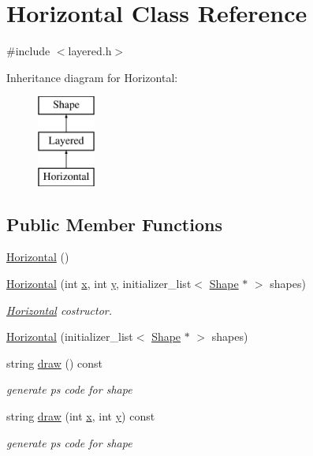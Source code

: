\hypertarget{class_horizontal}{}\section{Horizontal Class Reference}
\label{class_horizontal}


{\ttfamily \#include $<$layered.\+h$>$}

Inheritance diagram for Horizontal\+:\begin{figure}[H]
\begin{center}
\leavevmode
\includegraphics[height=3.000000cm]{class_horizontal}
\end{center}
\end{figure}
\subsection*{Public Member Functions}
\begin{DoxyCompactItemize}
\item 
\hyperlink{class_horizontal_a21ca6396569c657e9f6e16f07c9d0eec}{Horizontal} ()
\item 
\hyperlink{class_horizontal_a2f0a00cf0c24b1e5f001a315901274b0}{Horizontal} (int \hyperlink{class_shape_a41e403e73d2949f1a6adfba6032c41ec}{x}, int \hyperlink{class_shape_ac757f715cc5b5681f2c691663ac06f0a}{y}, initializer\+\_\+list$<$ \hyperlink{class_shape}{Shape} $\ast$ $>$ shapes)
\begin{DoxyCompactList}\small\item\em \hyperlink{class_horizontal}{Horizontal} costructor. \end{DoxyCompactList}\item 
\hyperlink{class_horizontal_a640dc2d55b1ba908b7eecff612b4e147}{Horizontal} (initializer\+\_\+list$<$ \hyperlink{class_shape}{Shape} $\ast$ $>$ shapes)
\item 
string \hyperlink{class_horizontal_a79e26b6d0db2a2b7e4f25a3f0f67e7a2}{draw} () const 
\begin{DoxyCompactList}\small\item\em generate ps code for shape \end{DoxyCompactList}\item 
string \hyperlink{class_horizontal_aea100857d1a9a269b66060b8bd32ced1}{draw} (int \hyperlink{class_shape_a41e403e73d2949f1a6adfba6032c41ec}{x}, int \hyperlink{class_shape_ac757f715cc5b5681f2c691663ac06f0a}{y}) const 
\begin{DoxyCompactList}\small\item\em generate ps code for shape \end{DoxyCompactList}\end{DoxyCompactItemize}
